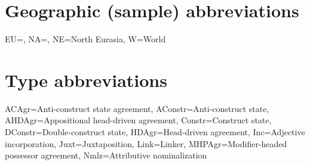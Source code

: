 \section{Geographic (sample) abbreviations}
\begin{flushleft}
EU=, NA=, NE=North Eurasia, W=World
\end{flushleft}


\section{Type abbreviations}
\begin{flushleft}
ACAgr=Anti\hyp{}construct state agreement, AConstr=Anti\hyp{}construct state, AHDAgr=Appositional head\hyp{}driven agreement, Constr=Construct state, DConstr=Double\hyp{}construct state, HDAgr=Head\hyp{}driven agreement, Inc=Adjective incorporation, Juxt=Juxtaposition, Link=Linker, MHPAgr=Modifier\hyp{}headed possessor agreement, Nmlz=Attributive nominalization
\end{flushleft}

